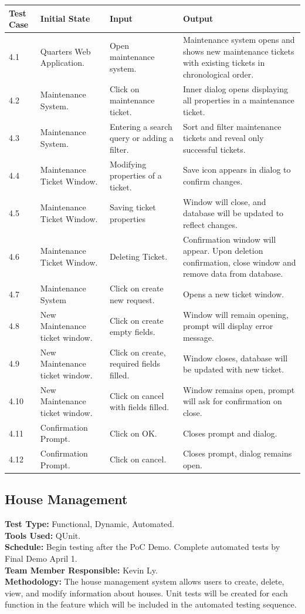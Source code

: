 \documentclass[12pt]{article}
\begin{document}
\begin{longtable}{|p{2cm}|p{3cm}|p{5cm}|p{5cm}|}
\hline
\textbf{Test Case}  & \textbf{Initial State} & \textbf{Input} & \textbf{Output} \\ \hline
4.1 & Quarters Web Application. & Open maintenance system. & Maintenance system opens and shows new maintenance tickets with existing tickets in chronological order. \\ 
\hline
4.2 & Maintenance System. & Click on maintenance ticket. & Inner dialog opens displaying all properties in a maintenance ticket. \\
\hline
4.3 & Maintenance System. & Entering a search query or adding a filter. & Sort and filter maintenance tickets and reveal only successful tickets. \\
\hline
4.4 & Maintenance Ticket Window. & Modifying properties of a ticket. & Save icon appears in dialog to confirm changes.\\
\hline
4.5 & Maintenance Ticket Window. & Saving ticket properties & Window will close, and database will be updated to reflect changes.\\
\hline
4.6 & Maintenance Ticket Window. & Deleting Ticket. & Confirmation window will appear. Upon deletion confirmation, close window and remove data from database.\\
\hline
4.7 & Maintenance System & Click on create new request. & Opens a new ticket window.\\
\hline
4.8 & New Maintenance ticket window. & Click on create empty fields. & Window will remain opening, prompt will display error message.\\
\hline
4.9 & New Maintenance ticket window. & Click on create, required fields filled. & Window closes, database will be updated with new ticket.\\
\hline
4.10 & New Maintenance ticket window. & Click on cancel with fields filled. & Window remains open, prompt will ask for confirmation on close.\\
\hline
4.11 & Confirmation Prompt. & Click on OK. & Closes prompt and dialog. \\
\hline
4.12 & Confirmation Prompt. & Click on cancel. & Closes prompt, dialog remains open.\\
\hline
\end{longtable}

\subsection{House Management}
\textbf{Test Type:} Functional, Dynamic, Automated. \\
\textbf{Tools Used:} QUnit. \\
\textbf{Schedule:} Begin testing after the PoC Demo. Complete automated tests by Final Demo April 1. \\
\textbf{Team Member Responsible:} Kevin Ly.\\
\textbf{Methodology:} The house management system allows users to create, delete, view, and modify information about houses. Unit tests will be created for each function in the feature which will be included in the automated testing sequence.
\end{document}
